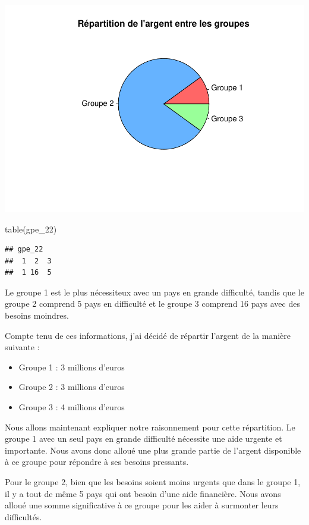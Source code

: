 \documentclass[
]{article}
\newenvironment{Shaded}{}{}
\newcommand{\FunctionTok}[1]{#1}
\newcommand{\NormalTok}[1]{#1}
\begin{document}
\includegraphics{Projet_files/figure-latex/unnamed-chunk-46-1.pdf}

\begin{Shaded}
\begin{Highlighting}[]
\FunctionTok{table}\NormalTok{(gpe\_22)}
\end{Highlighting}
\end{Shaded}

\begin{verbatim}
## gpe_22
##  1  2  3 
##  1 16  5
\end{verbatim}

Le groupe 1 est le plus nécessiteux avec un pays en grande difficulté,
tandis que le groupe 2 comprend 5 pays en difficulté et le groupe 3
comprend 16 pays avec des besoins moindres.

Compte tenu de ces informations, j'ai décidé de répartir l'argent de la
manière suivante :

\begin{itemize}
\item
  Groupe 1 : 3 millions d'euros
\item
  Groupe 2 : 3 millions d'euros
\item
  Groupe 3 : 4 millions d'euros
\end{itemize}

Nous allons maintenant expliquer notre raisonnement pour cette
répartition. Le groupe 1 avec un seul pays en grande difficulté
nécessite une aide urgente et importante. Nous avons donc alloué une
plus grande partie de l'argent disponible à ce groupe pour répondre à
ses besoins pressants.

Pour le groupe 2, bien que les besoins soient moins urgents que dans le
groupe 1, il y a tout de même 5 pays qui ont besoin d'une aide
financière. Nous avons alloué une somme significative à ce groupe pour
les aider à surmonter leurs difficultés.
\end{document}
